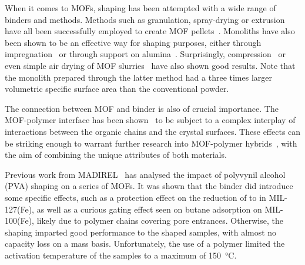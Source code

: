 When it comes to MOFs, shaping has been attempted with a wide range
of binders and methods. 
Methods such as granulation, spray-drying or extrusion have
all been successfully employed to create MOF
pellets~\cite{kaskelChemistryMetalorganicFrameworks2016}.
Monoliths have also been shown to be an effective way for shaping purposes,
either through impregnation~\cite{ramos-fernandezMOFsMeetMonoliths2011} 
or through support on alumina~\cite{aguadoFacileShapingImidazolatebased2010}.
Surprisingly, compression~\cite{bazer-bachiIndustrialUseMetalorganic2014} or
even simple air drying of MOF 
slurries~\cite{tianMechanicallyChemicallyRobust2015}
have also shown good results. Note that the monolith prepared 
through the latter method had a three times larger volumetric 
specific surface area than the conventional powder.

The connection between MOF and binder is also of crucial importance. 
The MOF-polymer interface has been 
shown~\cite{seminoMicroscopicModelMetal2016} to be
subject to a complex interplay of interactions between the organic
chains and the crystal surfaces. These effects can be striking enough 
to warrant further research into MOF-polymer 
hybrids~\cite{kitaoHybridizationMOFsPolymers2017}, with the aim 
of combining the unique attributes of both materials.

Previous work from MADIREL~\cite{chanutObservingEffectsShaping2016} 
has analysed the impact of polyvynil alcohol (PVA) shaping on a series 
of MOFs. It was shown that the binder did introduce some specific 
effects, such as a protection effect on the reduction of  to
 in MIL-127(Fe), as well as a curious gating effect seen on 
butane adsorption on MIL-100(Fe), likely due to polymer chains covering 
pore entrances. Otherwise, the shaping imparted good performance to the
shaped samples, with almost no capacity loss on
a mass basis. Unfortunately, the use of a polymer limited the 
activation temperature of the samples to a maximum of 
\SI{150}{\degreeCelsius}.